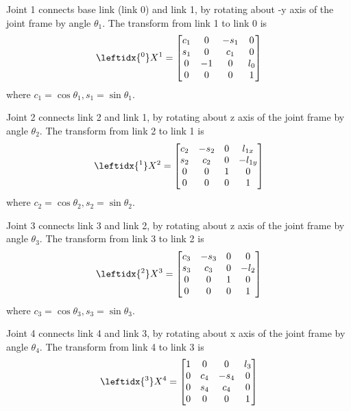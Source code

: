 \documentclass{article}
\begin{document}
Joint 1 connects base link (link 0) and link 1, by rotating about -y axis of the joint frame by angle $\theta_1$. The transform from link 1 to link 0 is
\begin{align}
\leftidx{^0}X^1 = \begin{bmatrix}c_1& 0 & -s_1 & 0\\
                                s_1& 0 & c_1 & 0\\
                                  0 & -1&  0  & l_0\\
                                  0 & 0 &  0  & 1\end{bmatrix}
\end{align}
where $c_1 = \cos\theta_1, s_1=\sin\theta_1$.

Joint 2 connects link 2 and link 1, by rotating about  z axis of the joint frame by angle $\theta_2$.  The transform from link 2 to link 1 is
\begin{align}
\leftidx{^1}X^2 = \begin{bmatrix}
	c_2 & -s_2 & 0  & l_{1x}\\
	s_2 & c_2  & 0  & -l_{1y}\\
	0   &  0   & 1  & 0\\
	0   & 0    & 0  & 1
		\end{bmatrix}
\end{align}
where $c_2 = \cos\theta_2, s_2 = \sin\theta_2$.

Joint 3 connects link 3 and link 2, by rotating about z axis of the joint frame by angle $\theta_3$. The transform from link 3 to link 2 is
\begin{align}
	\leftidx{^2}X^3 = \begin{bmatrix} 
		c_3 & -s_3 & 0 & 0\\
		s_3 &  c_3 & 0 & -l_2\\
		0 & 0 & 1 & 0\\
		0 & 0 & 0 & 1
	\end{bmatrix}
\end{align}
where $c_3 = \cos\theta_3, s_3 = \sin\theta_3$.

Joint 4 connects link 4 and link 3, by rotating about x axis of the joint frame by angle $\theta_4$. The transform from link 4 to link 3 is
\begin{align}
	\leftidx{^3}X^4 = \begin{bmatrix}
		1 & 0 & 0 & l_3\\
		0 & c_4 & -s_4 & 0\\
		0 & s_4 &  c_4 & 0\\
		0 & 0 & 0 & 1
	\end{bmatrix}
\end{align}
\end{document}
